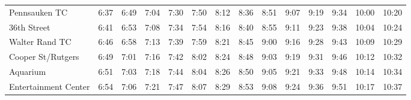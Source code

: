 \begin{center}
\begin{tabular}{@{}lrrrrrrrrrrrrr@{}}
Pennsauken TC & 6:37 & 6:49 & 7:04 & 7:30 & 7:50 & 8:12 & 8:36 & 8:51 & 9:07 & 9:19 & 9:34 & 10:00 & 10:20 \\
36th Street & 6:41 & 6:53 & 7:08 & 7:34 & 7:54 & 8:16 & 8:40 & 8:55 & 9:11 & 9:23 & 9:38 & 10:04 & 10:24 \\
Walter Rand TC & 6:46 & 6:58 & 7:13 & 7:39 & 7:59 & 8:21 & 8:45 & 9:00 & 9:16 & 9:28 & 9:43 & 10:09 & 10:29 \\
Cooper St/Rutgers & 6:49 & 7:01 & 7:16 & 7:42 & 8:02 & 8:24 & 8:48 & 9:03 & 9:19 & 9:31 & 9:46 & 10:12 & 10:32 \\
Aquarium & 6:51 & 7:03 & 7:18 & 7:44 & 8:04 & 8:26 & 8:50 & 9:05 & 9:21 & 9:33 & 9:48 & 10:14 & 10:34 \\
Entertainment Center & 6:54 & 7:06 & 7:21 & 7:47 & 8:07 & 8:29 & 8:53 & 9:08 & 9:24 & 9:36 & 9:51 & 10:17 & 10:37 \\
\bottomrule\end{tabular}\end{center}

